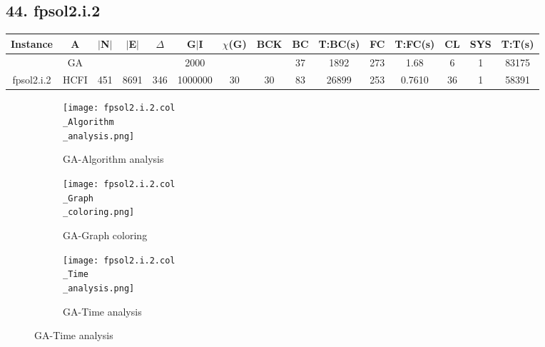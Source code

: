 \documentclass[10pt]{article}
\begin{document}
\subsection*{\hspace{0,9073976cm} 44. fpsol2.i.2}
\begin{table}[H]
\centering
\begin{tabular}{|c|c|c|c|c|c|c|c|c|c|c|c|c|c|c|}
\hline
Instance& A &$|$N$|$ & $|$E$|$ & $\Delta$ & G$|$I & $\chi$(G) &BCK&BC & T:BC(s) & FC & T:FC(s) & CL & SYS & T:T(s) \\ \hline \hline

	&GA&       &                   &                     & 2000        &     \cellcolor{yellow} & {\cellcolor{yellow}}& {{\cellcolor{green}37}}
&1892   &273          & 1.68                   &6                    &1          &83175        \\ \cline{2-2} \cline{6-6} \cline{9-15}
 \multirow{-2}{*}{fpsol2.i.2} &HCFI   &\multirow{-2}{*}{451}   &\multirow{-2}{*}{8691}     &\multirow{-2}{*}{346}     &1000000     &\multirow{-2}{*}{\cellcolor{yellow}30}      & \multirow{-2}{*}{\cellcolor{yellow}30}    &{\cellcolor{green}83}     &26899         &253    &0.7610         &36   &1     &58391        \\ \hline
\end{tabular}
\end{table}
\graphicspath{{./Core1/Solutions/GA/fpsol2.i.2.col}}
\begin{figure}[H]
\begin{subfigure}{.33\textwidth}
  \centering
  \texttt{[image: fpsol2.i.2.col\\\_Algorithm\\\_analysis.png]}
  \caption{GA-Algorithm analysis}
   \label{fig:subfig1}
\end{subfigure}%
\begin{subfigure}{.33\textwidth}
  \centering
  \texttt{[image: fpsol2.i.2.col\\\_Graph\\\_coloring.png]}
  \caption{GA-Graph coloring}
  \label{fig:subfig2}
\end{subfigure}
\begin{subfigure}{.33\textwidth}
  \centering
  \texttt{[image: fpsol2.i.2.col\\\_Time\\\_analysis.png]}
  \caption{GA-Time analysis}
  \end{subfigure}
\end{figure}
\end{document}
